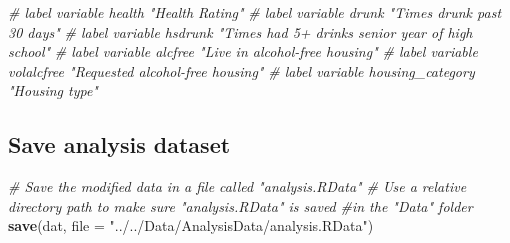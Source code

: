 \documentclass[]{article}
\newenvironment{Shaded}{\begin{snugshade}}{\end{snugshade}}
\newcommand{\CommentTok}[1]{\textcolor[rgb]{0.56,0.35,0.01}{\textit{#1}}}
\newcommand{\DataTypeTok}[1]{\textcolor[rgb]{0.13,0.29,0.53}{#1}}
\newcommand{\KeywordTok}[1]{\textcolor[rgb]{0.13,0.29,0.53}{\textbf{#1}}}
\newcommand{\NormalTok}[1]{#1}
\newcommand{\StringTok}[1]{\textcolor[rgb]{0.31,0.60,0.02}{#1}}
\begin{document}
\begin{Shaded}
\begin{Highlighting}[]
\CommentTok{# label variable health "Health Rating"}
\CommentTok{# label variable drunk "Times drunk past 30 days"}
\CommentTok{# label variable hsdrunk "Times had 5+ drinks senior year of high school"}
\CommentTok{# label variable alcfree "Live in alcohol-free housing"}
\CommentTok{# label variable volalcfree "Requested alcohol-free housing"}
\CommentTok{# label variable housing_category "Housing type"}
\end{Highlighting}
\end{Shaded}

\hypertarget{save-analysis-dataset}{%
\subsection{Save analysis dataset}\label{save-analysis-dataset}}

\begin{Shaded}
\begin{Highlighting}[]
\CommentTok{# Save the modified data in a file called "analysis.RData"}
\CommentTok{# Use a relative directory path to make sure "analysis.RData" is saved}
    \CommentTok{#in the "Data" folder}
\KeywordTok{save}\NormalTok{(dat, }\DataTypeTok{file =} \StringTok{"../../Data/AnalysisData/analysis.RData"}\NormalTok{)}
\end{Highlighting}
\end{Shaded}
\end{document}
